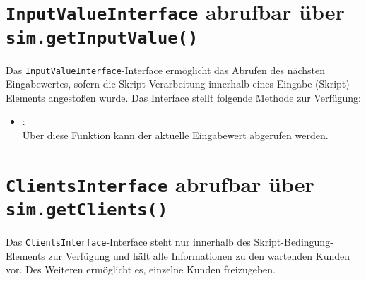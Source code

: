 \chapter{\texttt{InputValueInterface} abrufbar über \texttt{sim.getInputValue()}}

Das \texttt{InputValueInterface}-Interface ermöglicht das Abrufen des nächsten Eingabewertes,
sofern die Skript-Verarbeitung innerhalb eines Eingabe (Skript)-Elements
angestoßen wurde. Das Interface stellt folgende Methode zur Verfügung:

\begin{itemize}
\item
{}:\\
Über diese Funktion kann der aktuelle Eingabewert abgerufen werden.
\end{itemize}



\chapter{\texttt{ClientsInterface} abrufbar über \texttt{sim.getClients()}}

Das \texttt{ClientsInterface}-Interface steht nur innerhalb des Skript-Bedingung-Elements zur Verfügung
und hält alle Informationen zu den wartenden Kunden vor. Des Weiteren ermöglicht es, einzelne Kunden freizugeben.

